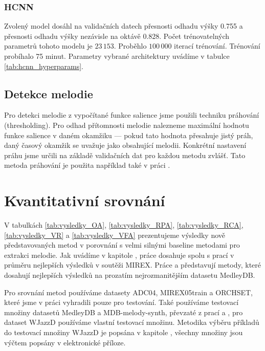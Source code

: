 \subsubsection{HCNN}

Zvolený model dosáhl na validačních datech přesnosti odhadu výšky 0.755 a přesnosti odhadu výšky nezávisle na oktávě 0.828. Počet trénovatelných parametrů tohoto modelu je $23\,153$. Proběhlo $100\,000$ iterací trénování. Trénování probíhalo 75 minut. Parametry vybrané architektury uvádíme v tabulce \ref{tab:hcnn_hyperparams}.

\subsection{Detekce melodie}

Pro detekci melodie z vypočítané funkce salience jsme použili techniku práhování (thresholding). Pro odhad přítomnosti melodie nalezneme maximální hodnotu funkce salience v daném okamžiku --- pokud tato hodnota přesahuje jistý práh, daný časový okamžik se uvažuje jako obsahující melodii. Konkrétní nastavení práhu jsme určili na základě validačních dat pro každou metodu zvlášť. Tato metoda práhování je použita například také v práci \cite{Bittner2017}.

\section{Kvantitativní srovnání}


V tabulkách \ref{tab:vysledky_OA}, \ref{tab:vysledky_RPA}, \ref{tab:vysledky_RCA}, \ref{tab:vysledky_VR} a \ref{tab:vysledky_VFA} prezentujeme výsledky nově představovaných metod v porovnání s velmi silnými baseline metodami pro extrakci melodie. Jak uvádíme v kapitole , práce \cite{Salamon2012a} dosahuje spolu s prací \cite{Dressler2009} v průměru nejlepších výsledků v soutěži MIREX. Práce \cite{Bittner2017} a \cite{DBasaranSEssid2018} představují metody, které dosahují nejlepších výsledků na prozatím nejrozmanitějším datasetu MedleyDB. 

Pro srovnání metod používáme datasety ADC04, MIREX05train a ORCHSET, které jsme v práci vyhradili pouze pro testování. Také používáme testovací množiny datasetů MedleyDB a MDB-melody-synth, převzaté z prací \cite{Bittner2017} a \cite{DBasaranSEssid2018}, pro dataset WJazzD používáme vlastní testovací množinu. Metodika výběru příkladů do testovací množiny WJazzD je popsána v kapitole , všechny množiny jsou výčtem popsány v elektronické příloze.

